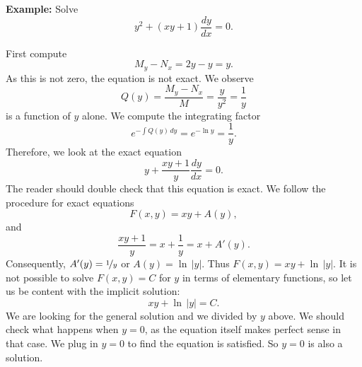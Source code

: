 \documentclass[10pt,aspectratio=169]{beamer}
\begin{document}
\begin{frame}
\textbf{Example:}
Solve
\begin{equation*}
y^2 + (xy+1) \frac{dy}{dx} = 0 .
\end{equation*}

First compute
\begin{equation*}
M_y-N_x = 2y-y = y .
\end{equation*}
As this is not zero, the equation is not exact.  We observe
\begin{equation*}
Q(y) = \frac{M_y-N_x}{M} = \frac{y}{y^2} = \frac{1}{y} 
\end{equation*}
is a function of $y$ alone.    We compute the integrating factor
\begin{equation*}
e^{-\int  Q(y) \, dy}
=
e^{-\ln y} = \frac{1}{y} .
\end{equation*}
Therefore, we look at the exact equation
\begin{equation*}
y + \frac{xy+1}{y} \frac{dy}{dx} = 0 .
\end{equation*}
The reader should double check that this equation is exact.
We follow the procedure for exact equations
\begin{equation*}
F(x,y) = xy + A(y) ,
\end{equation*}
and
\begin{equation}
\frac{xy+1}{y} = x+\frac{1}{y} = x+ A'(y) .
\end{equation}
Consequently, $A'(y) = \nicefrac{1}{y}$ or $A(y) = \ln \, \lvert y \rvert$.  Thus $F(x,y)
= xy + \ln \, \lvert y \rvert$.
It is not possible to solve $F(x,y)=C$ for $y$
in terms of elementary functions, so 
let us be content with the implicit solution:
\begin{equation*}
xy + \ln \, \lvert y \rvert = C .
\end{equation*}
We are looking for the general solution and we divided by
$y$ above.  We should check what happens when $y=0$, as the equation itself
makes perfect sense in that case.  We plug in $y=0$ to find the
equation is satisfied.  So $y=0$ is also a solution.
\end{frame}
\end{document}
